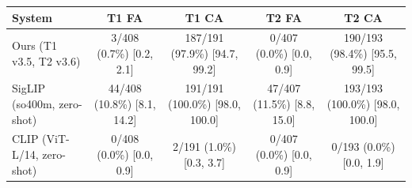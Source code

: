 \begin{tabular}{lcccc}
\toprule
System & T1 FA & T1 CA & T2 FA & T2 CA \\
\midrule
Ours (T1 v3.5, T2 v3.6) & 3/408 (0.7\%) [0.2, 2.1] & 187/191 (97.9\%) [94.7, 99.2] & 0/407 (0.0\%) [0.0, 0.9] & 190/193 (98.4\%) [95.5, 99.5] \\
SigLIP (so400m, zero-shot) & 44/408 (10.8\%) [8.1, 14.2] & 191/191 (100.0\%) [98.0, 100.0] & 47/407 (11.5\%) [8.8, 15.0] & 193/193 (100.0\%) [98.0, 100.0] \\
CLIP (ViT-L/14, zero-shot) & 0/408 (0.0\%) [0.0, 0.9] & 2/191 (1.0\%) [0.3, 3.7] & 0/407 (0.0\%) [0.0, 0.9] & 0/193 (0.0\%) [0.0, 1.9] \\
\bottomrule
\end{tabular}
